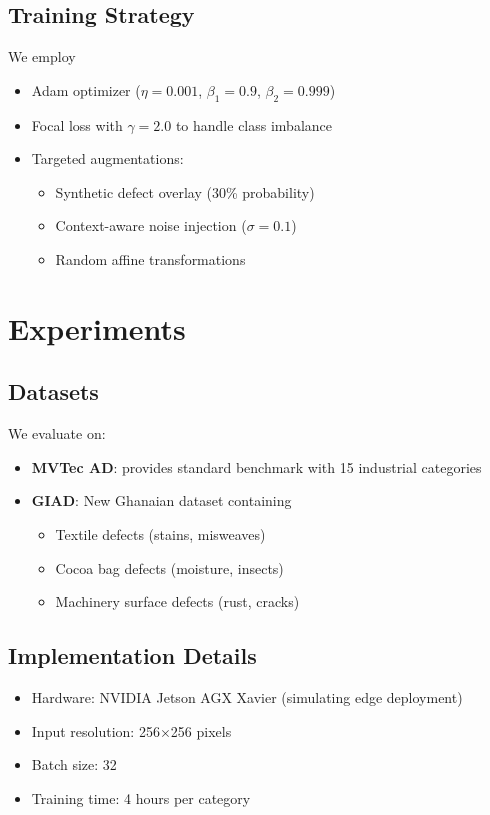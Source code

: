 \documentclass[conference]{IEEEtran}
\begin{document}
\subsection{Training Strategy}
We employ
\begin{itemize}
\item Adam optimizer ($\eta=0.001$, $\beta_1=0.9$, $\beta_2=0.999$)
\item Focal loss with $\gamma=2.0$ to handle class imbalance
\item Targeted augmentations:
\begin{itemize}
\item Synthetic defect overlay (30\% probability)
\item Context-aware noise injection ($\sigma=0.1$)
\item Random affine transformations
\end{itemize}
\end{itemize}

\section{Experiments}
\subsection{Datasets}
We evaluate on:
\begin{itemize}
\item \textbf{MVTec AD}: \cite{bergmann2019mvtec} provides standard benchmark with 15 industrial categories
\item \textbf{GIAD}: New Ghanaian dataset containing
\begin{itemize}
\item Textile defects (stains, misweaves)
\item Cocoa bag defects (moisture, insects)
\item Machinery surface defects (rust, cracks)
\end{itemize}
\end{itemize}

\subsection{Implementation Details}
\begin{itemize}
\item Hardware: NVIDIA Jetson AGX Xavier (simulating edge deployment)
\item Input resolution: 256$\times$256 pixels
\item Batch size: 32
\item Training time: 4 hours per category
\end{itemize}
\end{document}

